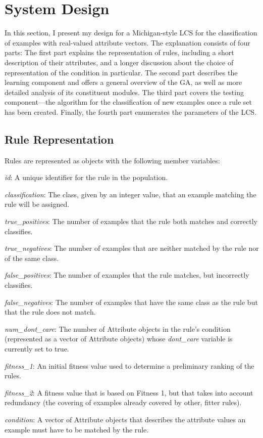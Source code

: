 \documentclass[11pt]{article}
\begin{document}
\section{System Design}

In this section, I present my design for a Michigan-style LCS for the classification of examples with real-valued attribute vectors. The explanation consists of four parts: The first part explains the representation of rules, including a short description of their attributes, and a longer discussion about the choice of representation of the condition in particular. The second part describes the learning component and offers a general overview of the GA, as well as more detailed analysis of its constituent modules. The third part covers the testing component---the algorithm for the classification of new examples once a rule set has been created. Finally, the fourth part enumerates the parameters of the LCS.

\subsection{Rule Representation}

Rules are represented as objects with the following member variables:

\begin{description}
\item \textit{id}: A unique identifier for the rule in the population.
\item \textit{classification}: The class, given by an integer value, that an example matching the rule will be assigned.
\item \textit{true\_positives}: The number of examples that the rule both matches and correctly classifies.
\item \textit{true\_negatives}: The number of examples that are neither matched by the rule nor of the same class.
\item \textit{false\_positives}: The number of examples that the rule matches, but incorrectly classifies.
\item \textit{false\_negatives}: The number of examples that have the same class as the rule but that the rule does not match.
\item \textit{num\_dont\_care}: The number of Attribute objects in the rule's condition (represented as a vector of Attribute objects) whose \textit{dont\_care} variable is currently set to true.
\item \textit{fitness\_1}: An initial fitness value used to determine a preliminary ranking of the rules.
\item \textit{fitness\_2}: A fitness value that is based on Fitness 1, but that takes into account redundancy (the covering of examples already covered by other, fitter rules).
\item \textit{condition}: A vector of Attribute objects that describes the attribute values an example must have to be matched by the rule.
\end{description}
\end{document}

